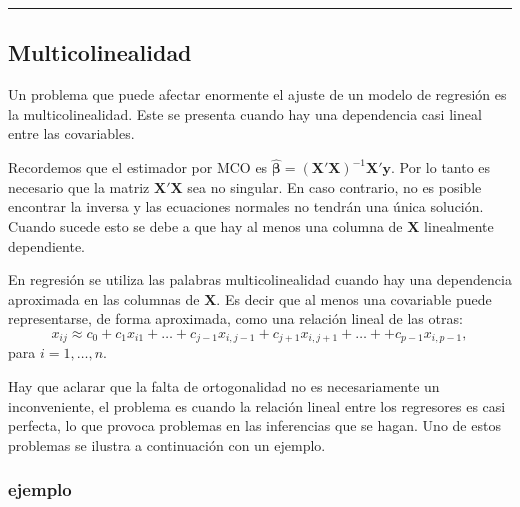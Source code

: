 \documentclass[
]{article}
\begin{document}
\rule{\textwidth}{0.4pt}

\hypertarget{multicolinealidad}{%
\subsection{Multicolinealidad}\label{multicolinealidad}}

Un problema que puede afectar enormente el ajuste de un modelo de regresión es la multicolinealidad. Este se presenta cuando hay una dependencia casi lineal entre las covariables.

Recordemos que el estimador por MCO es \(\widehat{\boldsymbol \beta}=(\boldsymbol X'\boldsymbol X)^{-1}\boldsymbol X'\boldsymbol y\). Por lo tanto es necesario que la matriz \(\boldsymbol X'\boldsymbol X\) sea no singular. En caso contrario, no es posible encontrar la inversa y las ecuaciones normales no tendrán una única solución. Cuando sucede esto se debe a que hay al menos una columna de \(\boldsymbol X\) linealmente dependiente.

En regresión se utiliza las palabras multicolinealidad cuando hay una dependencia aproximada en las columnas de \(\boldsymbol X\). Es decir que al menos una covariable puede representarse, de forma aproximada, como una relación lineal de las otras:
\[
x_{ij} \approx c_{0} + c_{1}x_{i1} + \ldots + c_{j-1}x_{i,j-1} + c_{j+1}x_{i,j+1} + \ldots + + c_{p-1}x_{i,p-1},
\]
para \(i=1,\ldots,n\).

Hay que aclarar que la falta de ortogonalidad no es necesariamente un inconveniente, el problema es cuando la relación lineal entre los regresores es casi perfecta, lo que provoca problemas en las inferencias que se hagan. Uno de estos problemas se ilustra a continuación con un ejemplo.

\hypertarget{ejemplo-2}{%
\subsubsection*{ejemplo}\label{ejemplo-2}}
\end{document}
